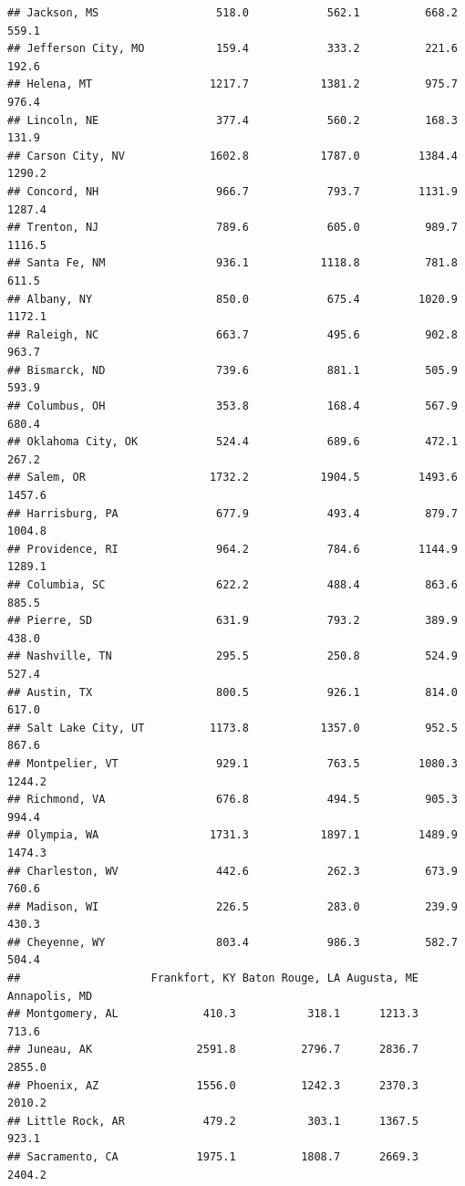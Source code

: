 \documentclass[
]{article}
\begin{document}
\begin{verbatim}
## Jackson, MS                  518.0            562.1          668.2      559.1
## Jefferson City, MO           159.4            333.2          221.6      192.6
## Helena, MT                  1217.7           1381.2          975.7      976.4
## Lincoln, NE                  377.4            560.2          168.3      131.9
## Carson City, NV             1602.8           1787.0         1384.4     1290.2
## Concord, NH                  966.7            793.7         1131.9     1287.4
## Trenton, NJ                  789.6            605.0          989.7     1116.5
## Santa Fe, NM                 936.1           1118.8          781.8      611.5
## Albany, NY                   850.0            675.4         1020.9     1172.1
## Raleigh, NC                  663.7            495.6          902.8      963.7
## Bismarck, ND                 739.6            881.1          505.9      593.9
## Columbus, OH                 353.8            168.4          567.9      680.4
## Oklahoma City, OK            524.4            689.6          472.1      267.2
## Salem, OR                   1732.2           1904.5         1493.6     1457.6
## Harrisburg, PA               677.9            493.4          879.7     1004.8
## Providence, RI               964.2            784.6         1144.9     1289.1
## Columbia, SC                 622.2            488.4          863.6      885.5
## Pierre, SD                   631.9            793.2          389.9      438.0
## Nashville, TN                295.5            250.8          524.9      527.4
## Austin, TX                   800.5            926.1          814.0      617.0
## Salt Lake City, UT          1173.8           1357.0          952.5      867.6
## Montpelier, VT               929.1            763.5         1080.3     1244.2
## Richmond, VA                 676.8            494.5          905.3      994.4
## Olympia, WA                 1731.3           1897.1         1489.9     1474.3
## Charleston, WV               442.6            262.3          673.9      760.6
## Madison, WI                  226.5            283.0          239.9      430.3
## Cheyenne, WY                 803.4            986.3          582.7      504.4
##                    Frankfort, KY Baton Rouge, LA Augusta, ME Annapolis, MD
## Montgomery, AL             410.3           318.1      1213.3         713.6
## Juneau, AK                2591.8          2796.7      2836.7        2855.0
## Phoenix, AZ               1556.0          1242.3      2370.3        2010.2
## Little Rock, AR            479.2           303.1      1367.5         923.1
## Sacramento, CA            1975.1          1808.7      2669.3        2404.2

\end{verbatim}
\end{document}
